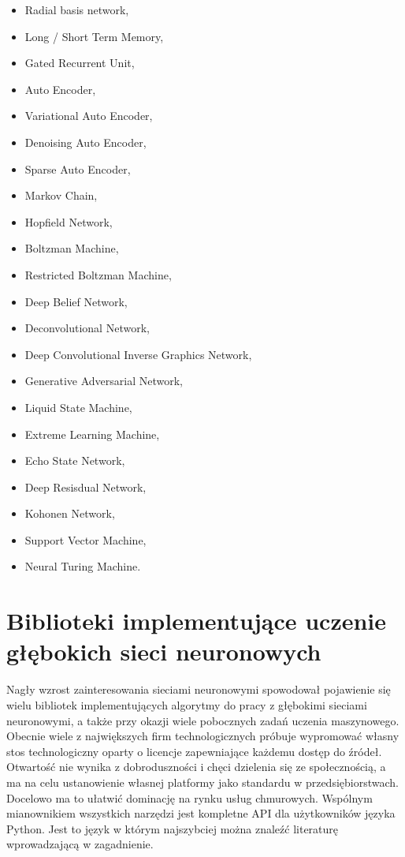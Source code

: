 \documentclass[12pt,a4paper,twoside,titlepage,openright]{book}
\begin{document}
\begin{itemize}
\item Radial basis network,
\item Long / Short Term Memory,
\item Gated Recurrent Unit,
\item Auto Encoder,
\item Variational Auto Encoder,
\item Denoising Auto Encoder,
\item Sparse Auto Encoder,
\item Markov Chain,
\item Hopfield Network,
\item Boltzman Machine,
\item Restricted Boltzman Machine,
\item Deep Belief Network,
\item Deconvolutional Network,
\item Deep Convolutional Inverse Graphics Network,
\item Generative Adversarial Network,
\item Liquid State Machine,
\item Extreme Learning Machine,
\item Echo State Network,
\item Deep Resisdual Network,
\item Kohonen Network,
\item Support Vector Machine,
\item Neural Turing Machine.
\end{itemize}

\chapter{Biblioteki implementujące uczenie głębokich sieci neuronowych}
Nagły wzrost zainteresowania sieciami neuronowymi spowodował pojawienie się wielu bibliotek implementujących algorytmy do pracy z głębokimi sieciami neuronowymi, a także przy okazji wiele pobocznych zadań uczenia maszynowego. Obecnie wiele z największych firm technologicznych próbuje wypromować własny stos technologiczny oparty o licencje zapewniające każdemu dostęp do źródeł. Otwartość nie wynika z dobroduszności i chęci dzielenia się ze społecznością, a ma na celu ustanowienie własnej platformy jako standardu w przedsiębiorstwach. Docelowo ma to ułatwić dominację na rynku usług chmurowych. Wspólnym mianownikiem wszystkich narzędzi jest kompletne API dla użytkowników języka Python. Jest to język w którym najszybciej można znaleźć literaturę wprowadzającą w zagadnienie. \cite{siteDLByLanguage}
\end{document}
